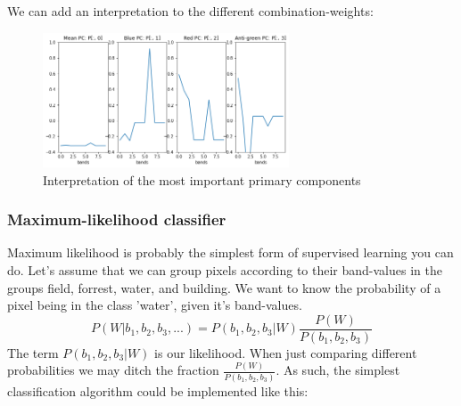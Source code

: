 We can add an interpretation to the different combination-weights:
\begin{figure}[H]
    \caption{Interpretation of the most important primary components}
    \centering
      \includegraphics[width=0.65\textwidth]{images/pca_wessling_pcs.png}
\end{figure}




\subsubsection{Maximum-likelihood classifier}
Maximum likelihood is probably the simplest form of supervised learning you can do.
Let's assume that we can group pixels according to their band-values in the groups field, forrest, water, and building.
We want to know the probability of a pixel being in the class 'water', given it's band-values.
\begin{equation}
    P(W|b_1, b_2, b_3, ...) = P(b_1, b_2, b_3 | W) \frac{P(W)}{P(b_1, b_2, b_3)}
\end{equation}
The term $P(b_1, b_2, b_3 | W)$ is our likelihood. When just comparing different probabilities we may ditch the fraction $\frac{P(W)}{P(b_1, b_2, b_3)}$. As such, the simplest classification algorithm could be implemented like this:

